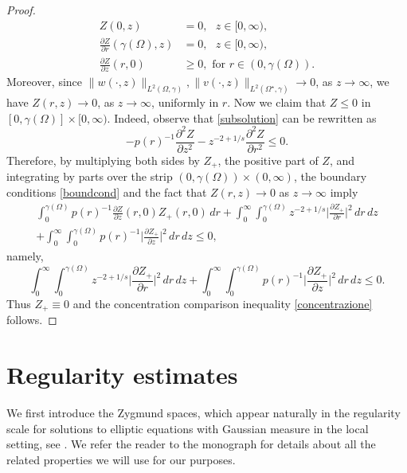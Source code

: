 \documentclass[a4paper,10pt,reqno]{amsart}
\numberwithin{equation}{section}
\begin{document}
\begin{proof}
\begin{align}
Z(0,z)  &  =0,\text{ \ \ }z\in[0,\infty),\nonumber \\
\frac{\partial Z}{\partial r}(\gamma(\Omega),z)  &  =0,\text{ \ \ }\label{boundcond}
z\in[0,\infty), \\
\frac{\partial Z}{\partial z}(r,0)  &  \geq0,\text{ \ for }r\in(0,\gamma(\Omega)).\nonumber
\end{align}
Moreover, since $\|w(\cdot,z)\|_{L^{2}(\Omega,\gamma)},\|v(\cdot,z)\|_{L^{2}(\Omega^{\displaystyle\star},\gamma)}
\rightarrow0$, as $z\rightarrow\infty$, we have
$Z(r,z)\rightarrow 0$, as $z\rightarrow\infty$, uniformly in $r$. Now we
claim that $Z\leq 0$ in $[0,\gamma(\Omega)]\times[0,\infty)$.
Indeed, observe that \eqref{subsolution} can be rewritten as
\[
-p(r)^{-1}\frac{\partial^2Z}{\partial z^2}-z^{-2+1/s}
\frac{\partial^2Z}{\partial r^2}\leq0.
\]
Therefore, by multiplying both sides by $Z_{+}$, the positive part of $Z$, and integrating by parts over the strip $(0,\gamma(\Omega))\times(0,\infty)$, the boundary conditions
\eqref{boundcond}
and the fact that $Z(r,z)\rightarrow0$ as $z\rightarrow\infty$ imply
\begin{multline*}
\int_{0}^{\gamma(\Omega)}p(r)^{-1}\frac{\partial Z}{\partial z}(r,0)Z_{+}(r,0)\,dr
+\int_{0}^{\infty}\int_{0}^{\gamma(\Omega)}z^{-2+1/s}\bigg|\frac{\partial Z_{+}}{\partial r}\bigg|^{2}\,dr\,dz\\
+\int_{0}^{\infty}\int_{0}^{\gamma(\Omega)}
p(r)^{-1}\bigg|\frac{\partial Z_{+}}{\partial z}\bigg|^{2}\,dr\,dz\leq0,
\end{multline*}
namely,
\[
\int_{0}^{\infty}\int_{0}^{\gamma(\Omega)}z^{-2+1/s}\bigg|\frac{\partial Z_{+}}{\partial r}\bigg|^{2}\,dr\,dz
+\int_{0}^{\infty}\int_{0}^{\gamma(\Omega)}
p(r)^{-1}\bigg|\frac{\partial Z_{+}}{\partial z}\bigg|^{2}\,dr\,dz\leq0.
\]
Thus $Z_{+}\equiv0$ and the concentration comparison inequality \eqref{concentrazione} follows.
\end{proof}

\section{Regularity estimates}\label{Section:regularity}

We first introduce the Zygmund spaces, which appear naturally in the regularity scale for solutions to elliptic
equations with Gaussian measure in the local setting, see \cite{dFP}. We refer the reader to the monograph \cite{Bennett} for details about all the related properties we will use for our purposes.
\end{document}
